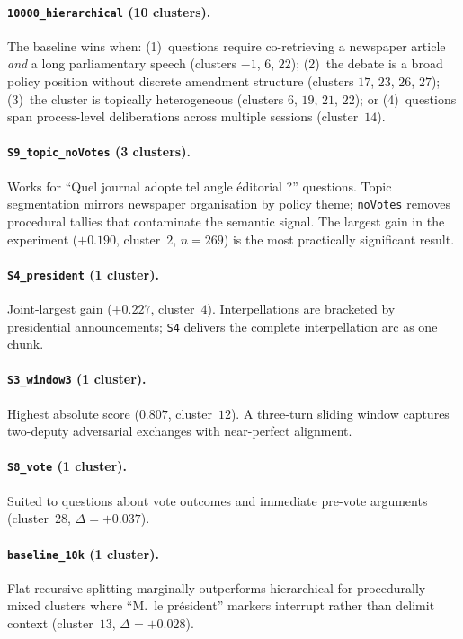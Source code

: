 \paragraph{\texttt{10000\_hierarchical} (10 clusters).}
The baseline wins when: (1)~questions require co-retrieving a newspaper article
\emph{and} a long parliamentary speech (clusters $-1$, $6$, $22$);
(2)~the debate is a broad policy position without discrete amendment structure
(clusters $17$, $23$, $26$, $27$); (3)~the cluster is topically heterogeneous
(clusters $6$, $19$, $21$, $22$); or (4)~questions span process-level
deliberations across multiple sessions (cluster~$14$).

\paragraph{\texttt{S9\_topic\_noVotes} (3 clusters).}
Works for ``Quel journal adopte tel angle \'{e}ditorial ?'' questions.
Topic segmentation mirrors newspaper organisation by policy theme; \texttt{noVotes}
removes procedural tallies that contaminate the semantic signal.
The largest gain in the experiment ($+0.190$, cluster~$2$, $n = 269$) is the most
practically significant result.

\paragraph{\texttt{S4\_president} (1 cluster).}
Joint-largest gain ($+0.227$, cluster~$4$).
Interpellations are bracketed by presidential announcements; \texttt{S4} delivers
the complete interpellation arc as one chunk.

\paragraph{\texttt{S3\_window3} (1 cluster).}
Highest absolute score ($0.807$, cluster~$12$).
A three-turn sliding window captures two-deputy adversarial exchanges with
near-perfect alignment.

\paragraph{\texttt{S8\_vote} (1 cluster).}
Suited to questions about vote outcomes and immediate pre-vote arguments
(cluster~$28$, $\Delta = +0.037$).

\paragraph{\texttt{baseline\_10k} (1 cluster).}
Flat recursive splitting marginally outperforms hierarchical for procedurally
mixed clusters where ``M.~le pr\'{e}sident'' markers interrupt rather than
delimit context (cluster~$13$, $\Delta = +0.028$).


